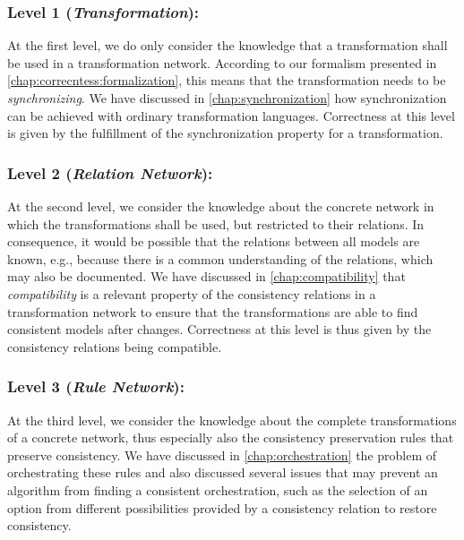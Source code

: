 
\subsubsection*{Level 1 (\emph{Transformation}):}
At the first level, we do only consider the knowledge that a transformation shall be used in a transformation network.
According to our formalism presented in \autoref{chap:correcntess:formalization}, this means that the transformation needs to be \emph{synchronizing}.
We have discussed in \autoref{chap:synchronization} how synchronization can be achieved with ordinary transformation languages.
Correctness at this level is given by the fulfillment of the synchronization property for a transformation.

\subsubsection*{Level 2 (\emph{Relation Network}):}
At the second level, we consider the knowledge about the concrete network in which the transformations shall be used, but restricted to their relations.
In consequence, it would be possible that the relations between all models are known, e.g., because there is a common understanding of the relations, which may also be documented.
We have discussed in \autoref{chap:compatibility} that \emph{compatibility} is a relevant property of the consistency relations in a transformation network to ensure that the transformations are able to find consistent models after changes.
Correctness at this level is thus given by the consistency relations being compatible.

\subsubsection*{Level 3 (\emph{Rule Network}):}
At the third level, we consider the knowledge about the complete transformations of a concrete network, thus especially also the consistency preservation rules that preserve consistency.
We have discussed in \autoref{chap:orchestration} the problem of orchestrating these rules and also discussed several issues that may prevent an algorithm from finding a consistent orchestration, such as the selection of an option from different possibilities provided by a consistency relation to restore consistency.


